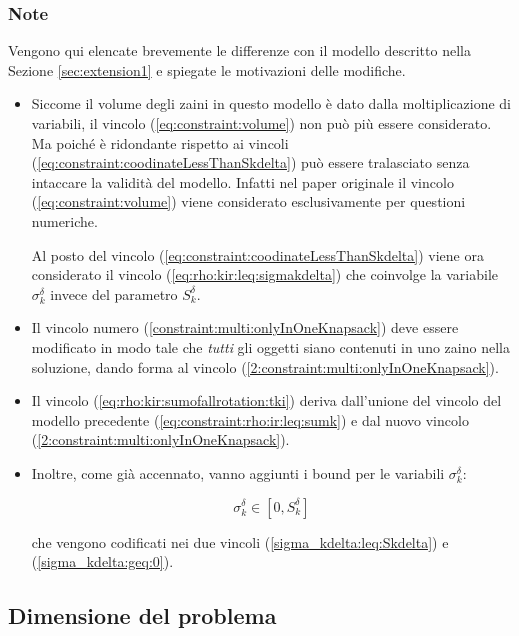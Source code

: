 \subsubsection{Note}
\label{sec:extension2:Note}
Vengono qui elencate brevemente le differenze con il modello descritto nella 
Sezione \ref{sec:extension1} e spiegate le motivazioni delle modifiche.
\begin{itemize}

\item Siccome il volume degli zaini in questo modello è dato dalla 
moltiplicazione di variabili, il vincolo
(\ref{eq:constraint:volume}) non può più essere considerato. 
Ma poiché è ridondante rispetto ai vincoli 
(\ref{eq:constraint:coodinateLessThanSkdelta})
può essere tralasciato senza intaccare la validità del modello.
Infatti nel paper originale il vincolo (\ref{eq:constraint:volume}) viene 
considerato esclusivamente per questioni numeriche.

Al posto del vincolo (\ref{eq:constraint:coodinateLessThanSkdelta}) viene ora 
considerato il vincolo 
(\ref{eq:rho:kir:leq:sigmakdelta}) che coinvolge la variabile $\sigma_k^\delta$
invece del parametro $S_k^\delta$.

\item Il vincolo numero (\ref{constraint:multi:onlyInOneKnapsack}) deve essere 
modificato in modo tale che \emph{tutti} gli oggetti siano contenuti in uno 
zaino nella soluzione, dando forma al vincolo 
(\ref{2:constraint:multi:onlyInOneKnapsack}).

\item Il vincolo (\ref{eq:rho:kir:sumofallrotation:tki}) deriva dall'unione
del vincolo del modello precedente  (\ref{eq:constraint:rho:ir:leq:sumk}) e dal 
nuovo vincolo (\ref{2:constraint:multi:onlyInOneKnapsack}).



\item Inoltre, come già accennato, vanno aggiunti i bound per le variabili 
$\sigma_k^\delta$:

\begin{equation}
\sigma_k^\delta \in [ 0, S_k^\delta ]
\end{equation}

che vengono codificati nei due vincoli
(\ref{sigma_kdelta:leq:Skdelta}) e (\ref{sigma_kdelta:geq:0}).
\end{itemize}
\subsection{Dimensione del problema}

